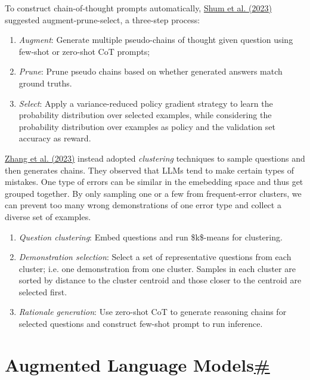 To construct chain-of-thought prompts automatically, \href{https://arxiv.org/abs/2302.12822}{Shum et al. (2023)} suggested augment-prune-select, a three-step process:

\begin{enumerate}
\tightlist
\item
  \emph{Augment}: Generate multiple pseudo-chains of thought given question using few-shot or zero-shot CoT prompts;
\item
  \emph{Prune}: Prune pseudo chains based on whether generated answers match ground truths.
\item
  \emph{Select}: Apply a variance-reduced policy gradient strategy to learn the probability distribution over selected examples, while considering the probability distribution over examples as policy and the validation set accuracy as reward.
\end{enumerate}

\href{https://arxiv.org/abs/2210.03493}{Zhang et al. (2023)} instead adopted \emph{clustering} techniques to sample questions and then generates chains. They observed that LLMs tend to make certain types of mistakes. One type of errors can be similar in the emebedding space and thus get grouped together. By only sampling one or a few from frequent-error clusters, we can prevent too many wrong demonstrations of one error type and collect a diverse set of examples.

\begin{enumerate}
\tightlist
\item
  \emph{Question clustering}: Embed questions and run \$k\$-means for clustering.
\item
  \emph{Demonstration selection}: Select a set of representative questions from each cluster; i.e. one demonstration from one cluster. Samples in each cluster are sorted by distance to the cluster centroid and those closer to the centroid are selected first.
\item
  \emph{Rationale generation}: Use zero-shot CoT to generate reasoning chains for selected questions and construct few-shot prompt to run inference.
\end{enumerate}

\section{\texorpdfstring{Augmented Language Models\hyperref[augmented-language-models]{\#}}{Augmented Language Models\#}}\label{augmented-language-models}

